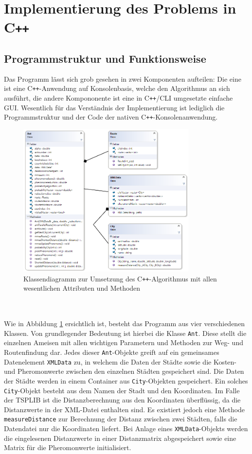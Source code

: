 \documentclass[doktyp=barbeit, sprache=german]{TUBAFarbeiten}
\begin{document}
\section{Implementierung des Problems in C\texttt{++}}
\label{sec:Implementierung}
\subsection{Programmstruktur und Funktionsweise}
Das Programm lässt sich grob gesehen in zwei Komponenten aufteilen: Die eine ist eine C\texttt{++}-Anwendung auf Konsolenbasis, welche den Algorithmus an sich ausführt, die andere Kompononente ist eine in C\texttt{++}/CLI umgesetzte einfache GUI. Wesentlich für das Verständnis der Implementierung ist lediglich die Programmstruktur und der Code der nativen C\texttt{++}-Konsolenanwendung. 
\begin{figure}
\captionsetup{justification=centering}
  \centering
     \includegraphics[width=0.8\textwidth]{images/classdiagram.png}
  \caption{Klassendiagramm zur Umsetzung des C\texttt{++}-Algorithmus mit allen wesentlichen Attributen und Methoden}
  \label{img:classdiagram}
\end{figure}
\\\\Wie in Abbildung \ref{img:classdiagram} ersichtlich ist, besteht das Programm aus vier verschiedenen Klassen. Von grundlegender Bedeutung ist hierbei die Klasse \texttt{Ant}. Diese stellt die einzelnen Ameisen mit allen wichtigen Parametern und Methoden zur Weg- und Routenfindung dar. Jedes dieser \texttt{Ant}-Objekte greift auf ein gemeinsames Datenelement \texttt{XMLData} zu, in welchem die Daten der Städte sowie die Kosten- und Pheromonwerte zwischen den einzelnen Städten gespeichert sind. Die Daten der Städte werden in einem Container aus \texttt{City}-Objekten gespeichert. Ein solches \texttt{City}-Objekt besteht aus dem Namen der Stadt und den Koordinaten. Im Falle der TSPLIB ist die Distanzberechnung aus den Koordinaten überflüssig, da die Distanzwerte in der XML-Datei enthalten sind.   Es existiert jedoch eine Methode \texttt{measureDistance} zur Berechnung der Distanz zwischen zwei Städten, falls die Datendatei nur die Koordinaten liefert. Bei Anlage eines \texttt{XMLData}-Objekts werden die eingelesenen Distanzwerte in einer Distanzmatrix abgespeichert sowie eine Matrix für die Pheromonwerte initialisiert.  
\end{document}
